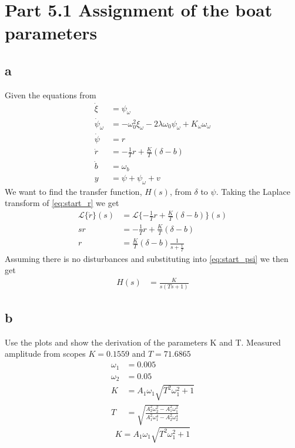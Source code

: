 \section{Part 5.1 Assignment of the boat parameters}
\subsection{a}
Given the equations from 
\begin{subequations}
\begin{align}
    \dot{\xi} &= \psi_\omega\\
    \dot{\psi}_\omega &= -\omega^2_0 \xi_\omega - 2 \lambda \omega_0 \psi_\omega + K_\omega \omega_\omega\\
    \dot{\psi} &= r\\ \label{eq:start_psi}
    \dot{r} &= -\frac{1}{T} r + \frac{K}{T} (\delta-b)\\ \label{eq:start_r}
    \dot{b} &= \omega_b\\
    y &= \psi + \psi_\omega + v
\end{align}
\end{subequations}
We want to find the transfer function, $H(s)$, from $\delta$ to $\psi$. Taking the Laplace transform of \cref{eq:start_r} we get 
\begin{align*}
    \mathcal{L}\{\dot{r}\}(s) &= \mathcal{L}\{{-\frac{1}{T} r + \frac{K}{T}
    (\delta - b)}\}(s)\\
    s r&=-\frac{1}{T} r + \frac{K}{T}(\delta - b)\\
    r &= \frac{K}{T}(\delta-b) \frac{1}{s+\frac{1}{T}}
\end{align*}
Assuming there is no disturbances and substituting into  \cref{eq:start_psi} we then get
\begin{align}
    H(s) &= \frac{K}{s(Ts+1)}
\end{align}
\subsection{b}
Use the plots and show the derivation of the parameters K and T. Measured amplitude from scopes
$K = 0.1559$ and $T = 71.6865$
\begin{align*}
    \omega_1 &= 0.005\\
    \omega_2 &= 0.05\\
    K &= A_1\omega_1\sqrt{T^2\omega_1^2+1}\\
    T &= \sqrt{\frac{A_2^2\omega_2^2-A_1^2\omega_1^2}{A_1^2\omega_1^4-A_2^2\omega_2^4}}
\end{align*}
$$K = A_1\omega_1\sqrt{T^2\omega_1^2+1}$$

